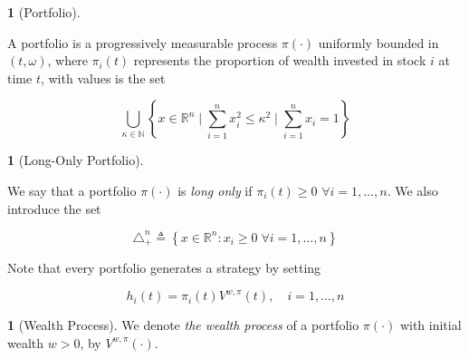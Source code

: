 \documentclass[british]{amsart}
\numberwithin{equation}{section}
\numberwithin{figure}{section}
\theoremstyle{plain}
\theoremstyle{definition}
\newtheorem{defn}[thm]{\protect\definitionname}
\theoremstyle{plain}
\theoremstyle{plain}
\theoremstyle{plain}
\theoremstyle{remark}
\newtheorem{rem}[thm]{\protect\remarkname}
\theoremstyle{plain}
\providecommand{\definitionname}{Definition}
\providecommand{\remarkname}{Remark}
\newcommand{\defeq}{\mathop{\triangleq}}
\newcommand{\rangei}{i=1,\dots,n}
\begin{document}
\begin{defn} [Portfolio] \label{def:portfolio}

  A portfolio is a progressively measurable process $\pi(\cdot)$ uniformly
bounded in $(t,\omega)$, where $\pi_{i}(t)$ represents the proportion of wealth
invested in stock $i$ at time $t$, with values is the set

  \begin{equation} \bigcup_{\kappa \in \mathbb{N}} \left\{ x \in \mathbb{R}^{n}
\mid \sum_{i=1}^{n} x_{i}^2 \le \kappa^2 \mid \sum_{i=1}^{n} x_{i} = 1 \right\}
\end{equation} \end{defn}

\begin{defn} [Long-Only Portfolio] \label{def:longonlyportfolio}

  We say that a portfolio $\pi(\cdot)$ is \textit{long only} if $\pi_{i}(t) \ge
0$ $\forall \rangei$. We also introduce the set 

  \begin{equation} \triangle_{+}^{n} \defeq \left\{
x\in\mathbb{R}^{n}:x_{i}\ge0\;\forall \rangei \right\} \end{equation}

\end{defn}

Note that every portfolio generates a strategy by setting 

\begin{equation} \label{eq:wealthinvestedbyportfolio} h_i(t) =
\pi_{i}(t)V^{w,\pi}(t), \quad \rangei \end{equation}

\begin{defn} [Wealth Process]
  
  We denote \textit{the wealth process} of a portfolio $\pi(\cdot)$ with initial
wealth $w > 0$, by $V^{w,\pi}(\cdot)$.

\end{defn}

 
\end{document}
